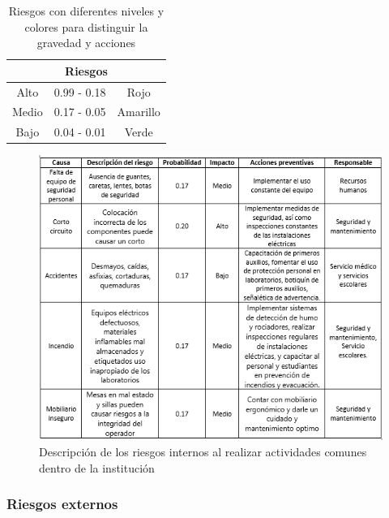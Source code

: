     \begin{table}[h]
        \centering
        \caption{Riesgos con diferentes niveles y colores para distinguir la gravedad y acciones}
        \begin{tabular}{c c c}
        \hline
        \multicolumn{3}{c}{\textbf{Riesgos}}\\
        \hline
             Alto& 0.99 - 0.18 & Rojo  \\
        \hline
             Medio& 0.17 - 0.05 & Amarillo  \\
        \hline
             Bajo& 0.04 - 0.01 & Verde \\
        \hline     
        \end{tabular}
        \label{tab:riego}
    \end{table}
    
    \begin{figure}[H]
        \centering
        \includegraphics[scale=0.35]{34/img/riesgosInternos.png}
        \caption{Descripción de los riesgos internos al realizar actividades comunes dentro de la institución}
        \label{fig:enter-label10}
    \end{figure}
     
    \subsubsection{Riesgos externos}
    
